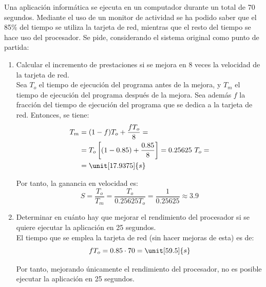 \begin{ejercicio}
Una aplicación informática se ejecuta en un computador durante un total de 70 segundos. Mediante el uso de un monitor de actividad se ha podido saber que el 85\% del tiempo se utiliza la tarjeta de red, mientras que el resto del tiempo se hace uso del procesador. Se pide, considerando el sistema original como punto de partida:
\begin{enumerate}
    \item Calcular el incremento de prestaciones si se mejora en 8 veces la velocidad de la tarjeta de red.\\
    
    Sea $T_o$ el tiempo de ejecución del programa antes de la mejora, y $T_m$ el tiempo de ejecución del programa después de la mejora. Sea además $f$ la fracción del tiempo de ejecución del programa que se dedica a la tarjeta de red. Entonces, se tiene:
    \begin{align*}
        T_m &= (1-f)T_o + \dfrac{fT_o}{8}
        =\\&= T_o\left[(1-0.85) + \dfrac{0.85}{8}\right]
        = 0.25625\ T_o
        =\\&= \unit[17.9375]{s}
    \end{align*}

    Por tanto, la ganancia en velocidad es:
    \begin{equation*}
        S = \dfrac{T_o}{T_m} = \dfrac{T_o}{0.25625T_o} = \frac{1}{0.25625} \approx 3.9
    \end{equation*}
    \item Determinar en cuánto hay que mejorar el rendimiento del procesador si se quiere ejecutar la aplicación en 25 segundos.\\
    
    El tiempo que se emplea la tarjeta de red (sin hacer mejoras de esta) es de:
    \begin{equation*}
        fT_o = 0.85\cdot 70 = \unit[59.5]{s}
    \end{equation*}

    Por tanto, mejorando únicamente el rendimiento del procesador, no es posible ejecutar la aplicación en 25 segundos.
\end{enumerate}
\end{ejercicio}

